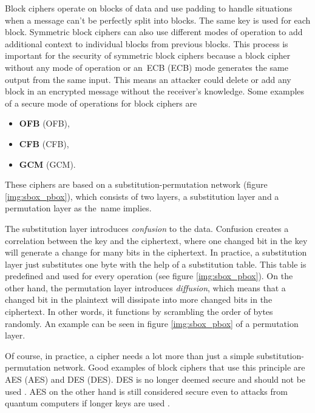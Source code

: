 Block ciphers operate on blocks of data and use padding to handle situations when a message can't be perfectly split into blocks. The same key is used for each block. Symmetric block ciphers can also use different modes of operation to add additional context to individual blocks from previous blocks. This process is important for the security of symmetric block ciphers because a block cipher without any mode of operation or an~ECB (\acl{ECB}) mode generates the same output from the same input. This means an attacker could delete or add any block in an encrypted message without the receiver's knowledge. Some examples of a secure mode of operations for block ciphers are \cite{Paar2010}
\begin{itemize}
  \item \textbf{OFB} (\acl{OFB}),
  \item \textbf{CFB} (\acl{CFB}),
  \item \textbf{GCM} (\acl{GCM}).
\end{itemize}

These ciphers are based on a substitution-permutation network (figure \ref{img:sbox_pbox}), which consists of two layers, a substitution layer and a permutation layer as the~name implies.

The substitution layer introduces \textit{confusion} to the data. Confusion creates a correlation between the key and the ciphertext, where one changed bit in the key will generate a change for many bits in the ciphertext. In practice, a substitution layer just substitutes one byte with the help of a substitution table. This table is predefined and used for every operation (see figure \ref{img:sbox_pbox}). On the other hand, the permutation layer introduces \textit{diffusion}, which means that a changed bit in the plaintext will dissipate into more changed bits in the ciphertext. In other words, it functions by scrambling the order of bytes randomly. An example can be seen in figure \ref{img:sbox_pbox} of a permutation layer. \cite{Paar2010}\cite{Shannon1949}

Of course, in practice, a cipher needs a lot more than just a simple substitution-permutation network. Good examples of block ciphers that use this principle are AES (\acl{AES}) and DES (\acl{DES}). DES is no longer deemed secure and should not be used \cite{Barker2017}. AES on the other hand is still considered secure even to attacks from quantum computers if longer keys are used \cite{Chen2016}.


